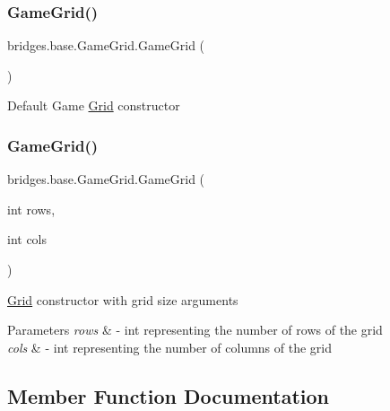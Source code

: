 \subsubsection{\texorpdfstring{Game\+Grid()}{GameGrid()}\hspace{0.1cm}{\footnotesize\ttfamily [1/2]}}
{\footnotesize\ttfamily bridges.\+base.\+Game\+Grid.\+Game\+Grid (\begin{DoxyParamCaption}{ }\end{DoxyParamCaption})}

Default Game \mbox{\hyperlink{classbridges_1_1base_1_1_grid}{Grid}} constructor \mbox{\label{classbridges_1_1base_1_1_game_grid_acfe6d52979dae94b1d883fed4965feb3}} 
\subsubsection{\texorpdfstring{Game\+Grid()}{GameGrid()}\hspace{0.1cm}{\footnotesize\ttfamily [2/2]}}
{\footnotesize\ttfamily bridges.\+base.\+Game\+Grid.\+Game\+Grid (\begin{DoxyParamCaption}\item[{int}]{rows,  }\item[{int}]{cols }\end{DoxyParamCaption})}

\mbox{\hyperlink{classbridges_1_1base_1_1_grid}{Grid}} constructor with grid size arguments


\begin{DoxyParams}{Parameters}
{\em rows} & -\/ int representing the number of rows of the grid \\
\hline
{\em cols} & -\/ int representing the number of columns of the grid \\
\hline
\end{DoxyParams}


\subsection{Member Function Documentation}
\mbox{\label{classbridges_1_1base_1_1_game_grid_a8eee4918e2cbfc956a92a39252590114}} 
